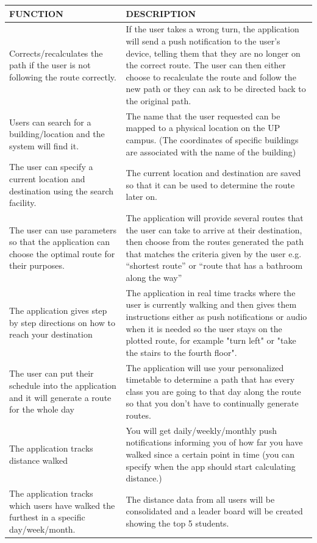 \documentclass[a4paper,12pt]{article}
\begin{document}
\begin{table}[!htbp]
\centering
\footnotesize
\label{tab:table 2.2}
\bgroup
\def\arraystretch{1.3}
\begin{tabular}{|L|L|}
\hline
FUNCTION & DESCRIPTION 
\\
\hline
Corrects/recalculates the path if the user is not following the route correctly. & If the user takes a wrong turn, the application will send a push notification to the user’s device, telling them that they are no longer on the correct route. The user can then either choose to recalculate the route and follow the new path or they can ask to be directed back to the original path. 
\\
\hline
Users can search for a building/location and the system will find it. & The name that the user requested can be mapped to a physical location on the UP campus. (The coordinates of specific buildings are associated with the name of the building)
\\
\hline
The user can specify a current location and destination using the search facility. & The current location and destination are saved so that it can be used to determine the route later on. 
\\
\hline
The user can use parameters so that the application can choose the optimal route for their purposes. & The application will provide several routes that the user can take to arrive at their destination, then choose from the routes generated the path that matches the criteria given by the user e.g. “shortest route” or “route that has a bathroom along the way”
\\
\hline
The application gives step by step directions on how to reach your destination & The application in real time tracks where the user is currently walking and then gives them instructions either as push notifications or audio when it is needed so the user stays on the plotted route, for example "turn left" or "take the stairs to the fourth floor". 
\\
\hline
The user can put their schedule into the application and it will generate a route for the whole day & The application will use your personalized timetable to determine a path that has every class you are going to that day along the route so that you don’t have to continually generate routes.
\\
\hline
The application tracks distance walked & You will get daily/weekly/monthly push notifications informing you of how far you have walked since a certain point in time (you can specify when the app should start calculating distance.)
\\
\hline
The application tracks which users have walked the furthest in a specific day/week/month. & The distance data from all users will be consolidated and a leader board will be created showing the top 5 students.
\\
\hline	
\end{tabular}
\egroup	
\end{table}
\end{document}
